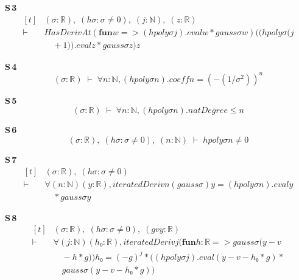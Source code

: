 \noindent\textbf{S\,3}\quad{}
{\footnotesize\[ \begin{aligned}[t]
&(\sigma : \mathbb{R} ),\; (\mathit{hσ} : \sigma \neq 0),\; (\mathit{j} : \mathbb{N} ),\; (\mathit{z} : \mathbb{R} )\\
\vdash\;&\mathit{HasDerivAt} (\mathbf{fun} \mathit{w} => (\mathit{hpoly} \sigma \mathit{j}).\mathit{eval} \mathit{w} * \mathit{gauss} \sigma \mathit{w}) ((\mathit{hpoly} \sigma (\mathit{j}\\
&\quad + 1)).\mathit{eval} \mathit{z} * \mathit{gauss} \sigma \mathit{z}) \mathit{z}
\end{aligned} \]}

\noindent\textbf{S\,4}\quad{}
{\footnotesize\[ (\sigma : \mathbb{R} ) \;\vdash\; \forall \mathit{n} : \mathbb{N} , (\mathit{hpoly} \sigma \mathit{n}).\mathit{coeff} \mathit{n} = (-(1 / \sigma ^{2})) ^{\mathit{n}} \]}

\noindent\textbf{S\,5}\quad{}
{\footnotesize\[ (\sigma : \mathbb{R} ) \;\vdash\; \forall \mathit{n} : \mathbb{N} , (\mathit{hpoly} \sigma \mathit{n}).\mathit{natDegree} \leq \mathit{n} \]}

\noindent\textbf{S\,6}\quad{}
{\footnotesize\[ (\sigma : \mathbb{R} ),\; (\mathit{hσ} : \sigma \neq 0),\; (\mathit{n} : \mathbb{N} ) \;\vdash\; \mathit{hpoly} \sigma \mathit{n} \neq 0 \]}

\noindent\textbf{S\,7}\quad{}
{\footnotesize\[ \begin{aligned}[t]
&(\sigma : \mathbb{R} ),\; (\mathit{hσ} : \sigma \neq 0)\\
\vdash\;&\forall (\mathit{n} : \mathbb{N} ) (\mathit{y} : \mathbb{R} ), \mathit{iteratedDeriv} \mathit{n} (\mathit{gauss} \sigma ) \mathit{y} = (\mathit{hpoly} \sigma \mathit{n}).\mathit{eval} \mathit{y}\\
&\quad * \mathit{gauss} \sigma \mathit{y}
\end{aligned} \]}

\noindent\textbf{S\,8}\quad{}
{\footnotesize\[ \begin{aligned}[t]
&(\sigma : \mathbb{R} ),\; (\mathit{hσ} : \sigma \neq 0),\; (\mathit{g} \mathit{v} \mathit{y} : \mathbb{R} )\\
\vdash\;&\forall (\mathit{j} : \mathbb{N} ) (\mathit{h₀} : \mathbb{R} ), \mathit{iteratedDeriv} \mathit{j} (\mathbf{fun} \mathit{h} : \mathbb{R} => \mathit{gauss} \sigma (\mathit{y} - \mathit{v}\\
&\quad - \mathit{h} * \mathit{g})) \mathit{h₀} = (-\mathit{g}) ^{\mathit{j}} * ((\mathit{hpoly} \sigma \mathit{j}).\mathit{eval} (\mathit{y} - \mathit{v} - \mathit{h₀} * \mathit{g}) *\\
&\quad \mathit{gauss} \sigma (\mathit{y} - \mathit{v} - \mathit{h₀} * \mathit{g}))
\end{aligned} \]}


